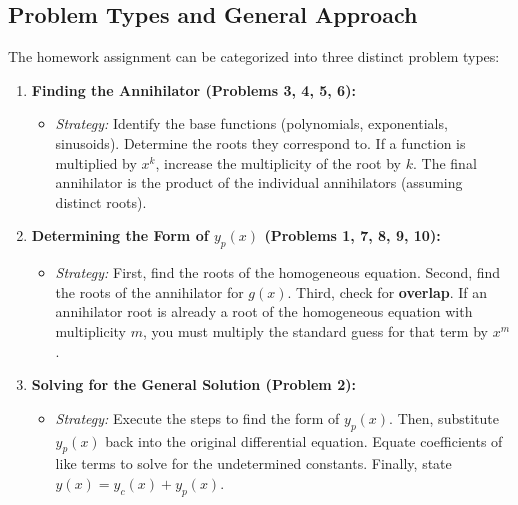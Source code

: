 \documentclass[11pt, a4paper]{article}
\theoremstyle{definition}
\theoremstyle{remark}
\begin{document}
\subsection{Problem Types and General Approach}
The homework assignment can be categorized into three distinct problem types:

\begin{enumerate}
    \item \textbf{Finding the Annihilator (Problems 3, 4, 5, 6):}
    \begin{itemize}
        \item \textit{Strategy:} Identify the base functions (polynomials, exponentials, sinusoids). Determine the roots they correspond to. If a function is multiplied by $x^k$, increase the multiplicity of the root by $k$. The final annihilator is the product of the individual annihilators (assuming distinct roots).
    \end{itemize}
    \item \textbf{Determining the Form of $y_p(x)$ (Problems 1, 7, 8, 9, 10):}
    \begin{itemize}
        \item \textit{Strategy:} First, find the roots of the homogeneous equation. Second, find the roots of the annihilator for $g(x)$. Third, check for \textbf{overlap}. If an annihilator root is already a root of the homogeneous equation with multiplicity $m$, you must multiply the standard guess for that term by $x^m$.
    \end{itemize}
    \item \textbf{Solving for the General Solution (Problem 2):}
    \begin{itemize}
        \item \textit{Strategy:} Execute the steps to find the form of $y_p(x)$. Then, substitute $y_p(x)$ back into the original differential equation. Equate coefficients of like terms to solve for the undetermined constants. Finally, state $y(x) = y_c(x) + y_p(x)$.
    \end{itemize}
\end{enumerate}
\end{document}
